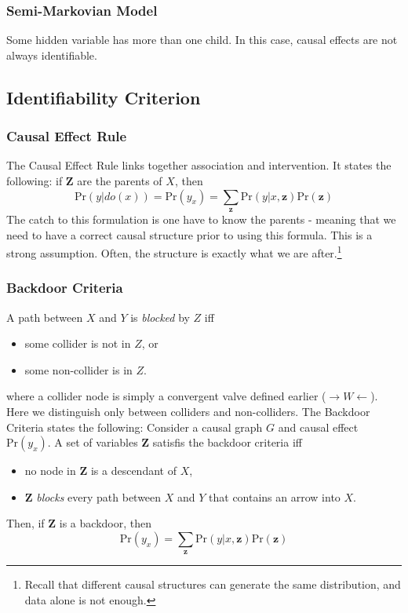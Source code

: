 \documentclass[11pt]{article}
\newcommand{\bz}{\mathbf{z}}
\newcommand{\pr}{\mathrm{Pr}}
\begin{document}
\subsubsection{Semi-Markovian Model}
Some hidden variable has more than one child. In this case, causal effects are not always identifiable. 

\subsection{Identifiability Criterion}
\subsubsection{Causal Effect Rule}
The Causal Effect Rule links together association and intervention. It states the following: if $\mathbf Z$ are the parents of $X$, then
\begin{equation}
	\pr (y | do(x)) = \pr(y_x) = \sum_{\mathbf z} \pr (y | x, \bz ) \pr (\bz)
\end{equation}
The catch to this formulation is one have to know the parents - meaning that we need to have a correct causal structure prior to using this formula. This is a strong assumption. Often, the structure is exactly what we are after.\footnote{
Recall that different causal structures can generate the same distribution, and data alone is not enough.
} 

\subsubsection{Backdoor Criteria}
A path between $X$ and $Y$ is \textit{\color{Thistle} blocked} by $Z$ iff 
\begin{itemize}
	\item some collider is not in $Z$, or
	\item some non-collider is in $Z$. 
\end{itemize}
where a collider node is simply a convergent valve defined earlier ($\rightarrow W \leftarrow$). Here we distinguish only between colliders and non-colliders. The Backdoor Criteria states the following: Consider a causal graph $G$ and causal effect $\pr(y_x)$. A set of variables $\mathbf Z$ satisfis the backdoor criteria iff 
\begin{itemize}
	\item no node in $\mathbf Z$ is a descendant of $X$, 
	\item $\mathbf Z$ \textit{\color{Thistle} blocks} every path between $X$ and $Y$ that contains an arrow into $X$. 
\end{itemize}
Then, if $\mathbf Z$ is a backdoor, then
\begin{equation}
	\pr ( y _ x) = \sum_{\bz} \pr (y | x, \bz) \pr (\bz)
\end{equation}
\end{document}
